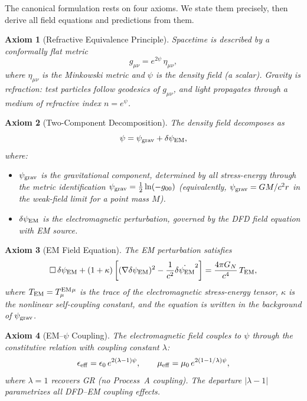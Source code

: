 \documentclass[11pt]{article}
\newtheorem{axiom}{Axiom}
\newcommand{\psigrav}{\psi_{\rm grav}}
\newcommand{\dpsiEM}{\delta\psi_{\rm EM}}
\newcommand{\GN}{G_N}
\newcommand{\lamdiff}{|\lambda{-}1|}
\begin{document}
The canonical formulation rests on four axioms. We state them precisely,
then derive all field equations and predictions from them.

\begin{axiom}[Refractive Equivalence Principle]
\label{ax:REP}
Spacetime is described by a conformally flat metric
\begin{equation}
g_{\mu\nu} = e^{2\psi}\,\eta_{\mu\nu},
\label{eq:conformal-metric}
\end{equation}
where $\eta_{\mu\nu}$ is the Minkowski metric and $\psi$ is the
\emph{density field} (a scalar). Gravity is refraction: test particles
follow geodesics of $g_{\mu\nu}$, and light propagates through a medium
of refractive index $n = e^\psi$.
\end{axiom}

\begin{axiom}[Two-Component Decomposition]
\label{ax:two-comp}
The density field decomposes as
\begin{equation}
\psi = \psigrav + \dpsiEM,
\label{eq:two-comp}
\end{equation}
where:
\begin{itemize}[nosep]
\item $\psigrav$ is the \emph{gravitational} component, determined by
  all stress-energy through the metric identification
  $\psigrav = \frac{1}{2}\ln(-g_{00})$ (equivalently, $\psigrav = GM/c^2 r$
  in the weak-field limit for a point mass $M$).
\item $\dpsiEM$ is the \emph{electromagnetic perturbation}, governed by
  the DFD field equation with EM source.
\end{itemize}
\end{axiom}

\begin{axiom}[EM Field Equation]
\label{ax:field-eq}
The EM perturbation satisfies
\begin{equation}
\Box\,\dpsiEM + (1+\kappa)\left[(\nabla\dpsiEM)^2
  - \frac{1}{c^2}\dot{\dpsiEM}^2\right]
= \frac{4\pi \GN}{c^4}\,T_{\rm EM},
\label{eq:EM-field-eq}
\end{equation}
where $T_{\rm EM} = T^{\rm EM}_{\mu}{}^{\mu}$ is the trace of the
electromagnetic stress-energy tensor, $\kappa$ is the nonlinear
self-coupling constant, and the equation is written in the background
of $\psigrav$.
\end{axiom}

\begin{axiom}[EM--$\psi$ Coupling]
\label{ax:coupling}
The electromagnetic field couples to $\psi$ through the constitutive
relation with coupling constant $\lambda$:
\begin{equation}
\epsilon_{\rm eff} = \epsilon_0\,e^{2(\lambda-1)\psi}, \qquad
\mu_{\rm eff} = \mu_0\,e^{2(1-1/\lambda)\psi},
\label{eq:constitutive}
\end{equation}
where $\lambda = 1$ recovers GR (no Process~A coupling). The departure
$\lamdiff$ parametrizes all DFD--EM coupling effects.
\end{axiom}
\end{document}

